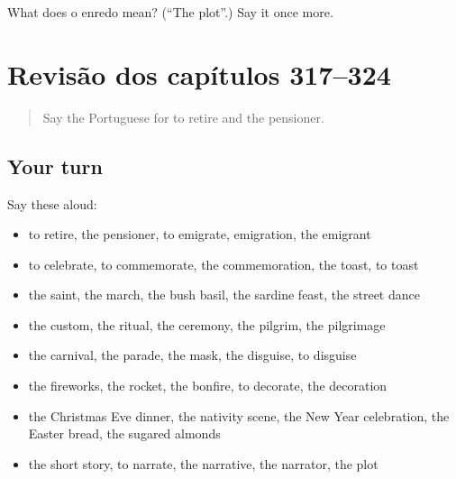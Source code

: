 \begin{tcolorbox}[breakable,colback=teal!4,colframe=teal!35!black,title={Before you move on}]
What does o enredo mean? (\textquotedblleft{}The plot\textquotedblright{}.) Say it once more.
\end{tcolorbox}
\section[(dialogue)]{Revisão dos capítulos 317–324}

\label{lesson:PT-R324-revisao-317-324}



\begin{quote}
Say the Portuguese for to retire and the pensioner.
\end{quote}

\subsection*{Your turn}
Say these aloud:

\begin{itemize}
\raggedright
  \item to retire, the pensioner, to emigrate, emigration, the emigrant
  \item to celebrate, to commemorate, the commemoration, the toast, to toast
  \item the saint, the march, the bush basil, the sardine feast, the street dance
  \item the custom, the ritual, the ceremony, the pilgrim, the pilgrimage
  \item the carnival, the parade, the mask, the disguise, to disguise
  \item the fireworks, the rocket, the bonfire, to decorate, the decoration
  \item the Christmas Eve dinner, the nativity scene, the New Year celebration, the Easter bread, the sugared almonds
  \item the short story, to narrate, the narrative, the narrator, the plot
\end{itemize}

